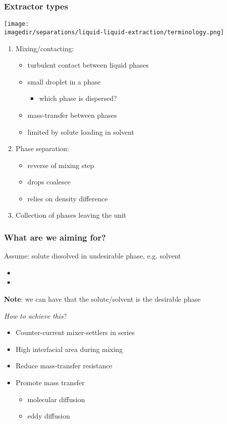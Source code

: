 \begin{frame}\frametitle{Extractor types}
	\begin{center}
		\texttt{[image: \\imagedir/separations/liquid-liquid-extraction/terminology.png]}
	\end{center}
	\begin{enumerate}
		\item	Mixing/contacting:
		 	\begin{itemize}
		 		\item	turbulent contact between liquid phases
		 		\item	small droplet {\color{purple}{dispersion}} in a {\color{purple}{continuous}} phase
				\begin{itemize}
					\item	which phase is dispersed?
				\end{itemize}
		 		\item	mass-transfer between phases
		 		\item	limited by solute loading in solvent
		 	\end{itemize}
		\item	Phase separation: 
			\begin{itemize}
				\item	reverse of mixing step
				\item	drops coalesce 
				\item	relies on density difference
			\end{itemize}
		\item	Collection of phases leaving the unit
	\end{enumerate}
\end{frame}

\begin{frame}\frametitle{What are we aiming for?}
	Assume: solute dissolved in undesirable phase, e.g. solvent
	\begin{itemize}
		\item	\iftoggle{instructor}{High recovery of solute in desired phase (phase)}{}
		\item	\iftoggle{instructor}{Concentrated solute in extract (water)}{}
	\end{itemize}
	\textbf{Note}: we can have that the solute/solvent is the desirable phase
	
	\vspace{12pt}
	\emph{How to achieve this}?
	\begin{itemize}
		\item	Counter-current mixer-settlers in series
		\item	High interfacial area during mixing
		\item	Reduce mass-transfer resistance
		\item	Promote mass transfer
		\begin{itemize}
			\item	molecular diffusion
			\item	eddy diffusion  \hfill {\color{myOrange}{$\leftarrow$ orders of magnitude greater}}
		\end{itemize}
	\end{itemize}
\end{frame}

